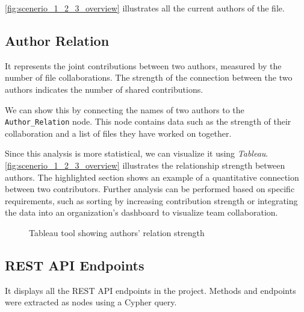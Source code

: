\autoref{fig:scenerio_1_2_3_overview} illustrates all the current authors of the file.

\subsection{Author Relation}
It represents the joint contributions between two authors, measured by the number of file collaborations. The strength of the connection between the two authors indicates the number of shared contributions.

We can show this by connecting the names of two authors to the \texttt{Author\_Relation} node. This node contains data such as the strength of their collaboration and a list of files they have worked on together.

Since this analysis is more statistical, we can visualize it using \textit{Tableau}. \autoref{fig:scenerio_1_2_3_overview} illustrates the relationship strength between authors. The highlighted section shows an example of a quantitative connection between two contributors. Further analysis can be performed based on specific requirements, such as sorting by increasing contribution strength or integrating the data into an organization's dashboard to visualize team collaboration.

\begin{figure}[H]
    \centering
    \caption{Tableau tool showing authors' relation strength}
    \label{fig:auth_relation_strength}
\end{figure}


\subsection{REST API Endpoints}
It displays all the REST API endpoints in the project. Methods and endpoints were extracted as nodes using a Cypher query.

